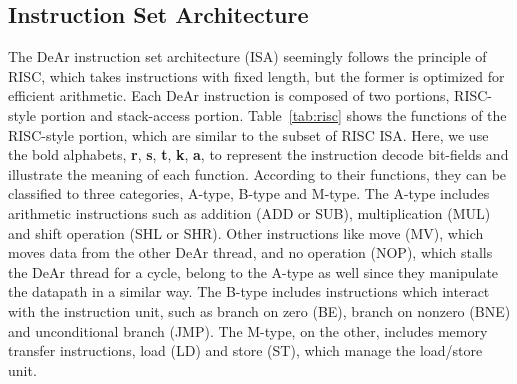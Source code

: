 \subsection{Instruction Set Architecture}
\label{sec:isa}
\indent The DeAr instruction set architecture (ISA) seemingly follows the principle of RISC, which takes instructions with fixed length, 
but the former is optimized for efficient arithmetic.
Each DeAr instruction is composed of two portions, RISC-style portion and stack-access portion.
Table~\ref{tab:risc} shows the functions of the RISC-style portion, which are similar to the subset of RISC ISA.
Here, we use the bold alphabets, \textbf{r}, \textbf{s}, \textbf{t}, \textbf{k}, \textbf{a}, 
to represent the instruction decode bit-fields and illustrate the meaning of each function.
According to their functions, they can be classified to three categories, A-type, B-type and M-type.
The A-type includes arithmetic instructions such as addition (ADD or SUB), multiplication (MUL) and shift operation (SHL or SHR).
Other instructions like move (MV), which moves data from the other DeAr thread, 
and no operation (NOP), which stalls the DeAr thread for a cycle, 
belong to the A-type as well since they manipulate the datapath in a similar way.
The B-type includes instructions which interact with the instruction unit, such as branch on zero (BE), branch on nonzero (BNE) and unconditional branch (JMP).
The M-type, on the other, includes memory transfer instructions, load (LD) and store (ST), which manage the load/store unit.
